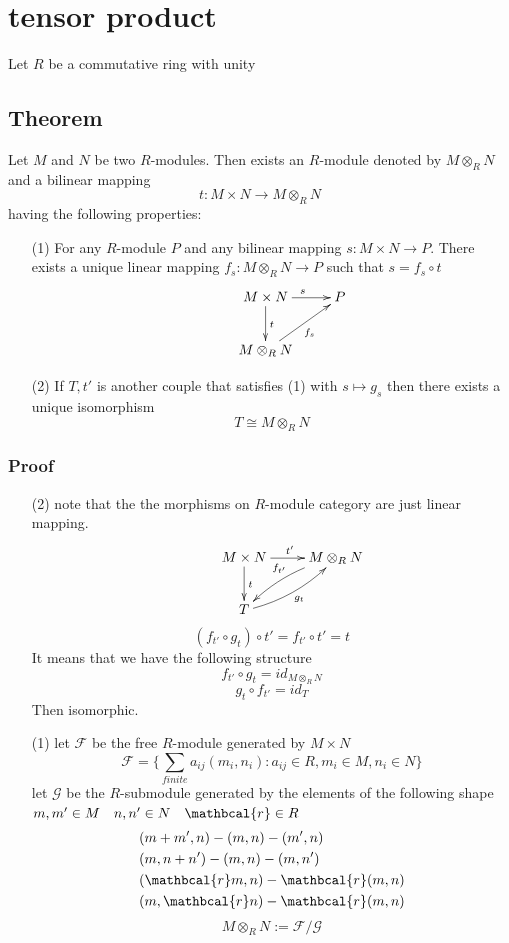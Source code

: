 \documentclass{book}
\begin{document}
\chapter{tensor product}
Let $R$ be a commutative ring with unity 
\section{Theorem}
Let $M$ and $N$ be two $R$-modules. Then exists an $R$-module denoted by $M\otimes _RN$ and a bilinear mapping 
$$t:M\times N\rightarrow M\otimes_RN$$ having the following properties:
\begin{itemize}
    \item[(1)]For any $R$-module $P$ and any bilinear mapping $s:M\times N\rightarrow P$. There exists a unique linear mapping $f_s:M\otimes_RN\rightarrow P$ such that $s=f_s\circ t$
    $$\xymatrix{
        & M\times N \ar[d]^t \ar[r]^s & P \\
        & M\otimes_RN\ar[ur]_{f_s}&
    } $$
    \item[(2)] If $T,t'$ is another couple that satisfies (1) with $s\mapsto g_s$ then there exists a unique isomorphism $$T\cong M\otimes_RN$$
\end{itemize}
\subsection*{Proof}
\begin{itemize}
    \item[(2)]
    note that the the morphisms on $R$-module category are just linear mapping. 
    $$\xymatrix{
    & M\times N \ar[d]^t \ar[r]^{t'} &M\otimes_RN\ar@/_/[dl]_{f_{t'}}\\
    &T\ar@/_/[ur]_{g_t}	
    }$$
    $$(f_{t'}\circ g_t)\circ t'=f_{t'}\circ t'=t$$
    It means that we have the following structure
    $$f_{t'}\circ g_t=id_{M\otimes_RN}$$
    $$g_t\circ f_{t'}=id_T$$
    Then isomorphic.

    \item [(1)]let $\mathcal{F}$ be the free $R$-module generated by $M\times N$
    $$\mathcal{F}=\{\sum\limits_{finite}a_{ij}(m_i,n_i):a_{ij}\in R,m_i\in M,n_i\in N\}$$
    let $\mathcal{G}$ be the $R$-submodule generated by the elements of the following shape $m,m'\in M\quad n,n'\in N\quad \mathbcal{r}\in R$
    $$\begin{aligned}
        &(m+m',n)-(m,n)-(m',n)\\
        &(m,n+n')-(m,n)-(m,n')\\
        &(\mathbcal{r}m,n)-\mathbcal{r}(m,n)\\
        &(m,\mathbcal{r}n)-\mathbcal{r}(m,n)
    \end{aligned}$$
    $$M\otimes_RN:=\mathcal{F}/\mathcal{G}$$
\end{itemize}
\end{document}
